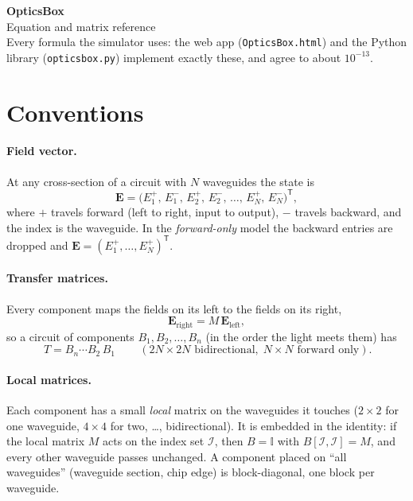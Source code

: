 \documentclass[10pt,a4paper]{article}
\newcommand{\T}{\mathsf{T}}
\begin{document}
\begin{center}
  {\LARGE\bfseries\color{accent} OpticsBox}\\[3pt]
  {\large Equation and matrix reference}\\[4pt]
  {\small\color{muted} Every formula the simulator uses: the web app (\texttt{OpticsBox.html}) and the Python library
  (\texttt{opticsbox.py}) implement exactly these, and agree to about $10^{-13}$.}
\end{center}
\vspace{2pt}

\setcounter{tocdepth}{1}\tableofcontents

\section{Conventions}

\paragraph{Field vector.} At any cross-section of a circuit with $N$ waveguides the state is
\[
  \mathbf{E} = \bigl(E_1^{+},\,E_1^{-},\,E_2^{+},\,E_2^{-},\,\dots,\,E_N^{+},\,E_N^{-}\bigr)^{\T},
\]
where $+$ travels forward (left to right, input to output), $-$ travels backward, and the index is the waveguide.
In the \emph{forward-only} model the backward entries are dropped and $\mathbf{E}=(E_1^{+},\dots,E_N^{+})^{\T}$.

\paragraph{Transfer matrices.} Every component maps the fields on its left to the fields on its right,
\[
  \mathbf{E}_{\text{right}} = M\,\mathbf{E}_{\text{left}},
\]
so a circuit of components $B_1,B_2,\dots,B_n$ (in the order the light meets them) has
\[
  \boxed{\,T = B_n \cdots B_2\, B_1\,}
  \qquad (2N\times 2N \text{ bidirectional},\; N\times N \text{ forward only}).
\]

\paragraph{Local matrices.} Each component has a small \emph{local} matrix on the waveguides it touches
($2\times2$ for one waveguide, $4\times4$ for two, \dots, bidirectional). It is embedded in the identity: if the local
matrix $M$ acts on the index set $\mathcal{I}$, then $B = \mathbb{I}$ with $B[\mathcal{I},\mathcal{I}] = M$, and every
other waveguide passes unchanged. A component placed on ``all waveguides'' (waveguide section, chip edge) is block-diagonal,
one block per waveguide.
\end{document}
